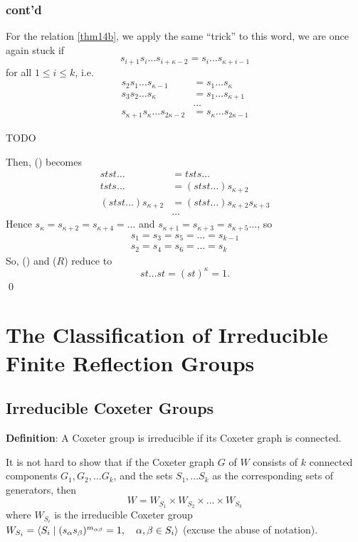 \subsection{cont'd}

For the relation \eqref{thm14b}, we apply the same ``trick'' to this word,
we are once again stuck if
\[
    s_{i+1} s_i \dots s_{i+\kappa-2} = s_i \dots s_{\kappa+i-1}
\]
for all $1 \leq i \leq k$, i.e.
\begin{align*}
    s_2 s_1 \dots s_{\kappa-1} &= s_1 \dots s_{\kappa} \\
    s_3 s_2 \dots s_{\kappa} &= s_1 \dots s_{\kappa+1} \\
    & \dots \\
    s_{\kappa+1} s_{\kappa} \dots s_{2\kappa-2} &= s_{\kappa} \dots s_{2\kappa-1}
\end{align*}

TODO

Then, (\textasteriskcentered\textasteriskcentered) becomes
\begin{align*}
    stst \dots &= tsts \dots \\
    tsts \dots &= (stst \dots) s_{\kappa+2} \\
    (stst \dots) s_{\kappa+2} &= (stst \dots) s_{\kappa+2} s_{\kappa+3} \\
    & \dots
\end{align*}
Hence $s_\kappa = s_{\kappa+2} = s_{\kappa+4} = \dots$ and
$s_{\kappa+1} = s_{\kappa+3} = s_{\kappa+5} \dots$, so
\begin{align*}
    s_1 = s_3 = s_5 = \dots = s_{k-1} \\
    s_2 = s_4 = s_6 = \dots = s_{k}
\end{align*}
So, (\textasteriskcentered\textasteriskcentered) and ($R$) reduce to
\[
    st \dots st = (st)^\kappa = 1.
\]
\qed

\chapter{The Classification of Irreducible Finite Reflection Groups}

\section{Irreducible Coxeter Groups}

{\bf Definition}: A Coxeter group is irreducible if its Coxeter graph is
connected.

It is not hard to show that if the Coxeter graph $G$ of $W$ consists of $k$
connected components $G_1, G_2, \dots G_k$, and the sets $S_1, \dots S_k$ as
the corresponding sets of generators, then
\[
    W = W_{S_1} \times W_{S_2} \times \dots \times W_{S_k}
\]
where $W_{S_i}$ is the irreducible Coxeter group $W_{S_i} = \langle S_i \mid
(s_\alpha s_\beta)^{m_{\alpha \beta}} = 1, \quad \alpha, \beta \in S_i \rangle$
(excuse the abuse of notation).

